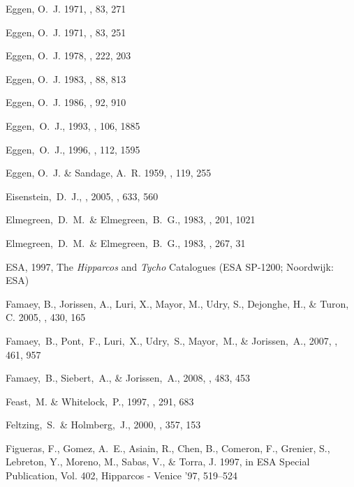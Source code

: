 \begin{thebibliography}{99}
{Eggen}, O.~J. 1971{}, \pasp, 83, 271

{Eggen}, O.~J. 1971{}, \pasp, 83, 251

{Eggen}, O.~J. 1978, \apj, 222, 203

{Eggen}, O.~J. 1983, \aj, 88, 813

{Eggen}, O.~J. 1986, \aj, 92, 910

  Eggen,~O.~J., 1993,
  \aj, 106, 1885

  Eggen,~O.~J., 1996,
  \aj, 112, 1595

{Eggen}, O.~J. \& {Sandage}, A.~R. 1959, \mnras, 119, 255

  Eisenstein,~D.~J., \etal, 2005, \apj, 633, 560

  Elmegreen,~D.~M.~\& Elmegreen,~B.~G., 1983,
  \mnras, 201, 1021

  Elmegreen,~D.~M.~\& Elmegreen,~B.~G., 1983,
  \apj, 267, 31

{ESA}, 1997, {The \emph{Hipparcos} and \emph{Tycho} Catalogues} (ESA SP-1200; Noordwijk: ESA)

  {Famaey}, B., {Jorissen}, A., {Luri}, X., {Mayor}, M., {Udry}, S., {Dejonghe},
  H., \& {Turon}, C. 2005, \aap, 430, 165

  Famaey,~B., Pont,~F., Luri,~X., Udry,~S., Mayor,~M., \& Jorissen,~A., 2007,
  \aap, 461, 957

  Famaey,~B., Siebert,~A., \& Jorissen,~A., 2008,
  \aap, 483, 453

 Feast,~M. \& Whitelock,~P., 1997,
  \mnras, 291, 683

  Feltzing,~S.~\& Holmberg,~J., 2000,
  \aap, 357, 153
  
{Figueras}, F., {Gomez}, A.~E., {Asiain}, R., {Chen}, B., {Comeron}, F.,
  {Grenier}, S., {Lebreton}, Y., {Moreno}, M., {Sabas}, V., \& {Torra}, J.
  1997, in ESA Special Publication, Vol. 402, Hipparcos - Venice '97, 519--524


\end{thebibliography}
